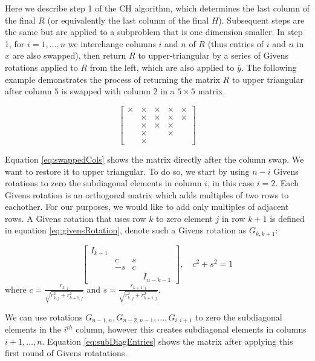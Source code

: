 \documentclass[12pt,Bold,letterpaper]{mcgilletdclass}
\begin{document}
Here we describe  step 1 of the CH algorithm, which determines the last column of the final $R$ 
(or equivalently the last column of the final $H$).
Subsequent steps are the same but are applied to a subproblem that is one dimension smaller. 
In step 1, for $i = 1,\dots,n$ we interchange
columns $i$ and $n$ of  $R$ (thus entries of $i$ and $n$ in $x$ are also swapped), then return $R$ to upper-triangular
by a series of Givens rotations applied to $R$ from the left, which  are also applied to $\bar{y}$. The following example demonstrates the process of returning the matrix $R$ to upper triangular after column $5$ is swapped with column $2$ in a $5 \times 5$ matrix.

\begin{equation} \label{eq:swappedCols}
\begin{bmatrix}
\times & \times & \times & \times & \times\\ 
  & \times & \times & \times & \times\\ 
  & \times & \times & \times &  \\ 
  & \times &  &  \times &  \\ 
  & \times &  &    & 
\end{bmatrix}
\end{equation}

Equation \ref{eq:swappedCols} shows the matrix directly after the column swap. We want to restore it to upper triangular. To do so, we start by using $n-i$ Givens rotations to zero the subdiagonal elements in column $i$, in this case $i = 2$. Each Givens rotation is an orthogonal matrix which adds multiples of two rows to eachother. For our purposes, we would like to add only multiples of adjacent rows. A Givens rotation that uses row $k$ to zero element $j$ in row $k+1$ is defined in equation \eqref{eq:givensRotation}, denote such a Givens rotation as $G_{k,k+1}$:

\begin{equation} \label{eq:givensRotation}
\begin{bmatrix}
I_{k-1} &  &  & \\ 
 & c & s & \\ 
 & -s & c & \\ 
 &  &  & I_{n-k-1}
\end{bmatrix} ,\quad c^2+s^2=1
\end{equation}
where $c=\frac{r_{k,j}}{\sqrt{r_{k,j}^2+r_{k+1,j}^2}}$ and $s=\frac{r_{k+1,j}}{\sqrt{r_{k,j}^2+r_{k+1,j}^2}}.$

We can use rotations $G_{n-1,n}, G_{n-2,n-1}, \dots, G_{i,i+1}$ to zero the subdiagonal elements in the $i^{th}$ column, however this creates subdiagonal elements in columns $i+1, \dots, n$. Equation \eqref{eq:subDiagEntries} shows the matrix after applying this first round of Givens rotatations.
\end{document}

